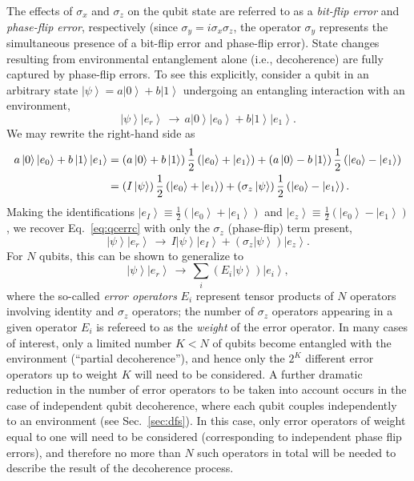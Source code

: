 \documentclass[3p,sort&compress,12pt]{elsarticle}
\newcommand{\ket}[1]{\left\vert{#1}\right\rangle}
\newcommand{\I}{\ensuremath{i}}
\newcommand{\op}[1]{#1}
\begin{document}
The effects of $\sigma_x$ and $\sigma_z$ on the qubit state are referred to as a \emph{bit-flip error} and \emph{phase-flip error}, respectively (since $\op{\sigma}_y= \I\op{\sigma}_x\op{\sigma}_z$, the operator $\op{\sigma}_y$ represents the simultaneous presence of a bit-flip error and phase-flip error). State changes resulting from environmental entanglement alone (i.e., decoherence) are fully captured by phase-flip errors. To see this explicitly, consider a qubit in an arbitrary state $\ket{\psi}=a\ket{0}+b\ket{1}$ undergoing an entangling interaction with an environment,
%
\begin{equation} 
\ket{\psi}\ket{e_r} \,\longrightarrow\, a\ket{0}\ket{e_0}+b\ket{1}\ket{e_1}.
\end{equation}
%
We may rewrite the right-hand side as
%
\begin{align} 
a\ket{0}\ket{e_0}+b\ket{1}\ket{e_1} &= \left( a\ket{0}+b\ket{1} \right) \frac{1}{2} \left( \ket{e_0}+\ket{e_1}\right) + \left( a\ket{0}-b\ket{1} \right) \frac{1}{2} \left( \ket{e_0}-\ket{e_1}\right) \notag \\
&= \left(\op{I} \ket{\psi} \right) \frac{1}{2} \left( \ket{e_0}+\ket{e_1}\right) + \left(\op{\sigma}_z \ket{\psi} \right) \frac{1}{2} \left( \ket{e_0}-\ket{e_1}\right).
\end{align}
%
Making the identifications $\ket{e_I} \equiv \frac{1}{2} \left( \ket{e_0}+\ket{e_1}\right)$ and $\ket{e_z} \equiv \frac{1}{2} \left( \ket{e_0}-\ket{e_1}\right)$, we recover Eq.~\eqref{eq:qcerrc} with only the $\op{\sigma}_z$ (phase-flip) term present,
%
\begin{equation} \label{eq:qcerrcaa} \ket{\psi}
  \ket{e_r}  \, \longrightarrow \, I
  \ket{\psi} \ket{e_I} + 
  \left( \sigma_z \ket{\psi} \right)
  \ket{e_z}.
\end{equation}
%
For $N$ qubits, this can be shown to generalize to 
%
\begin{equation}\label{eq:qcerrcN}
  \ket{\psi} \ket{e_r} \, \longrightarrow\,
  \sum_{i} 
  \left( E_i \ket{\psi} \right) \ket{e_i},
\end{equation}
%
where the so-called \emph{error operators} $E_i$ represent tensor products of $N$ operators involving identity and $\sigma_z$ operators; the number of $\sigma_z$ operators appearing in a given operator $E_i$ is refereed to as the \emph{weight} of the error operator. In many cases of interest, only a limited number $K<N$ of qubits become entangled with the environment  (``partial decoherence''), and hence only the $2^K$ different error operators up to weight $K$ will need to be considered. A further dramatic reduction in the number of error operators to be taken into account occurs in the case of independent qubit decoherence, where each qubit couples independently to an environment (see Sec.~\ref{sec:dfs}). In this case, only error operators of weight equal to one will need to be considered (corresponding to independent phase flip errors), and therefore no more than $N$ such operators in total will be needed to describe the result of the decoherence process. 
\end{document}
